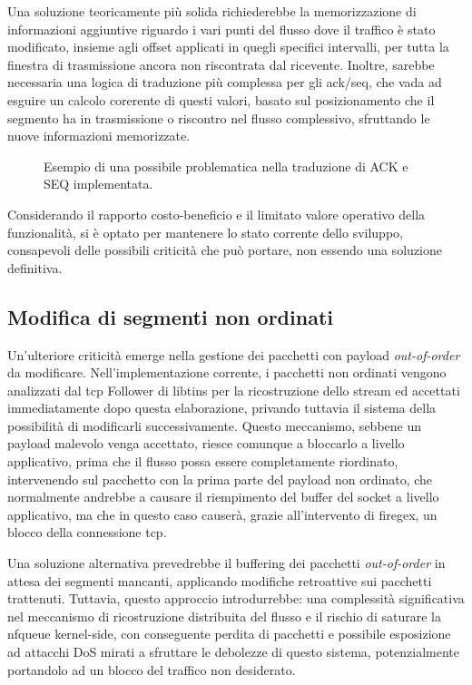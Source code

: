 Una soluzione teoricamente più solida richiederebbe la memorizzazione di informazioni aggiuntive riguardo i vari punti del flusso dove il traffico è stato modificato, insieme agli offset applicati in quegli specifici intervalli, per tutta la finestra di trasmissione ancora non riscontrata dal ricevente. Inoltre, sarebbe necessaria una logica di traduzione più complessa per gli \gls{ack}/\gls{seq}, che vada ad esguire un calcolo corerente di questi valori, basato sul posizionamento che il segmento ha in trasmissione o riscontro nel flusso complessivo, sfruttando le nuove informazioni memorizzate.

\begin{figure}[H]
    \centering
    
    \caption{Esempio di una possibile problematica nella traduzione di ACK e SEQ implementata.}\label{fig:tcp_ack_seq_transl_failure}
\end{figure}

Considerando il rapporto costo-beneficio e il limitato valore operativo della funzionalità, si è optato per mantenere lo stato corrente dello sviluppo, consapevoli delle possibili criticità che può portare, non essendo una soluzione definitiva.

\subsection{Modifica di segmenti non ordinati}

Un'ulteriore criticità emerge nella gestione dei pacchetti con payload \textit{out-of-order} da modificare. Nell'implementazione corrente, i pacchetti non ordinati vengono analizzati dal \gls{tcp} Follower di libtins per la ricostruzione dello stream ed accettati immediatamente dopo questa elaborazione, privando tuttavia il sistema della possibilità di modificarli successivamente. Questo meccanismo, sebbene un payload malevolo venga accettato, riesce comunque a bloccarlo a livello applicativo, prima che il flusso possa essere completamente riordinato, intervenendo sul pacchetto con la prima parte del payload non ordinato, che normalmente andrebbe a causare il riempimento del buffer del socket a livello applicativo, ma che in questo caso causerà, grazie all'intervento di firegex, un blocco della connessione \gls{tcp}.

Una soluzione alternativa prevedrebbe il buffering dei pacchetti \textit{out-of-order} in attesa dei segmenti mancanti, applicando modifiche retroattive sui pacchetti trattenuti. Tuttavia, questo approccio introdurrebbe: una complessità significativa nel meccanismo di ricostruzione distribuita del flusso e il rischio di saturare la \gls{nfqueue} kernel-side, con conseguente perdita di pacchetti e possibile esposizione ad attacchi DoS mirati a sfruttare le debolezze di questo sistema, potenzialmente portandolo ad un blocco del traffico non desiderato.

